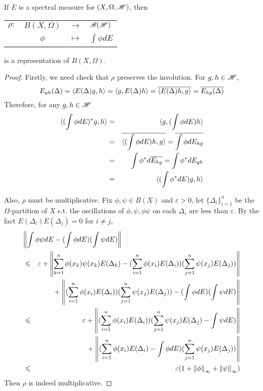 \documentclass[a4paper,11pt]{report}
\begin{document}
\begin{prop}
	If $E$ is a spectral measure for $(X,\Omega,\mathscr{H})$, then
	\begin{center}
		\begin{tabular}{l c c l}
			$\rho \colon$ & $B(X,\Omega)$ & $\longrightarrow$ & $\mathscr{B(H)}$ \\
			~ & $\phi$ & $\longmapsto$ & $\int \phi dE$
		\end{tabular}
	\end{center}
	is a representation of $B(X,\Omega)$.
\end{prop}
\begin{proof}
	Firstly, we need check that $\rho$ preserves the involution. For $g,h \in \mathscr{H}$,
	\begin{equation*}
		E_{gh}(\Delta) = \langle E(\Delta)g, h \rangle = \langle g, E(\Delta)h \rangle = \overline{\langle E(\Delta)h, g \rangle} = \overline{E_{hg}(\Delta)}
	\end{equation*}
	Therefore, for any $g,h \in \mathscr{H}$
	\begin{eqnarray*}
		\langle (\int \phi dE)^{*}g,h \rangle &=& \langle g, (\int \phi dE)h \rangle \\
		&=& \overline{\langle (\int \phi dE)h, g \rangle} = \overline{\int \phi dE_{hg}} \\
		&=& \int \phi^{*} d \overline{E_{hg}} = \int \phi^{*} dE_{gh} \\ 
		&=& \langle (\int \phi^{*} dE)g,h \rangle
	\end{eqnarray*}
	\item Also, $\rho$ must be multiplicative. Fix $\phi,\psi \in B(X)$ and $\varepsilon >0$, let $\{\Delta_i\}_{i=1}^{n}$ be the $\Omega$-partition of $X$ s.t. the oscillations of $\phi,\psi,\phi\psi$ on each $\Delta_i$ are less than $\varepsilon$.
	By the fact $E(\Delta_i)E(\Delta_j) = 0$ for $i \neq j$, 
	\begin{eqnarray*}
		\lefteqn{\norm{\int \phi\psi dE - (\int \phi dE)(\int \psi dE)}} \\
		&\leqslant& \varepsilon+ \norm{\sum_{k=1}^{n}\phi(x_k)\psi(x_k)E(\Delta_k) - (\sum_{i=1}^{n}\phi(x_i)E(\Delta_i))(\sum_{j=1}^{n}\psi(x_j)E(\Delta_j))} \\
		&& \negmedspace{} + \norm{(\sum_{i=1}^{n}\phi(x_i)E(\Delta_i))(\sum_{j=1}^{n}\psi(x_j)E(\Delta_j))-(\int \phi dE)(\int \psi dE)} \\
		&\leqslant& \varepsilon + \norm{(\sum_{i=1}^{n}\phi(x_i)E(\Delta_i))(\sum_{j=1}^{n}\psi(x_j)E(\Delta_j)-\int \psi dE)} \\
		&& \negmedspace{} + \norm{(\sum_{i=1}^{n}\phi(x_i)E(\Delta_i)-\int \phi dE)(\sum_{j=1}^{n}\psi(x_j)E(\Delta_j))} \\
		&\leqslant& \varepsilon(1+\norm{\phi}_{\infty}+\norm{\psi}_{\infty})
	\end{eqnarray*} 
	Then $\rho$ is indeed multiplicative.
\end{proof}
\end{document}
